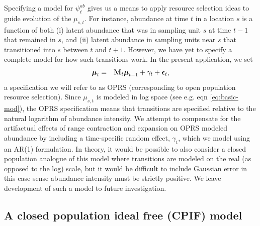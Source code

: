 \documentclass[times,mee,doublespace,]{besauth2}
\begin{document}
Specifying a model for $\psi^{ab}_t$ gives us a means to apply resource selection ideas to guide evolution of the $\mu_{s,t}$.  For instance, abundance at time $t$ in a location $s$ is a function of both (i) latent abundance that was in sampling unit $s$ at time $t-1$ that remained in $s$, and (ii) latent abundance in sampling units near $s$ that transitioned into $s$ between $t$ and $t+1$.  However, we have yet to specify a complete model for how such transitions work.  In the present application, we set
\begin{eqnarray*}
  \boldsymbol{\mu}_t & = & {\bf M}_t \boldsymbol{\mu}_{t-1} + \gamma_t + \boldsymbol{\epsilon}_t, %
\end{eqnarray*}
a specification we will refer to as OPRS (corresponding to open population resource selection). Since $\mu_{s,t}$ is modeled in log space (see e.g. eqn \ref{eq:basic-mod}), the OPRS specification means that transitions are specified relative to the natural logarithm of abundance intensity. We attempt to compensate for the artifactual effects of range contraction and expansion on OPRS modeled abundance by including a time-specific random effect, $\gamma_t$, which we model using an AR(1) formulation.  In theory, it would be possible to also consider a closed population analogue of this model where transitions are modeled on the real (as opposed to the log) scale, but it would be difficult to include Gaussian error in this case sense abundance intensity must be strictly positive.  We leave development of such a model to future investigation.


\subsection{A closed population ideal free (CPIF) model}
\end{document}
